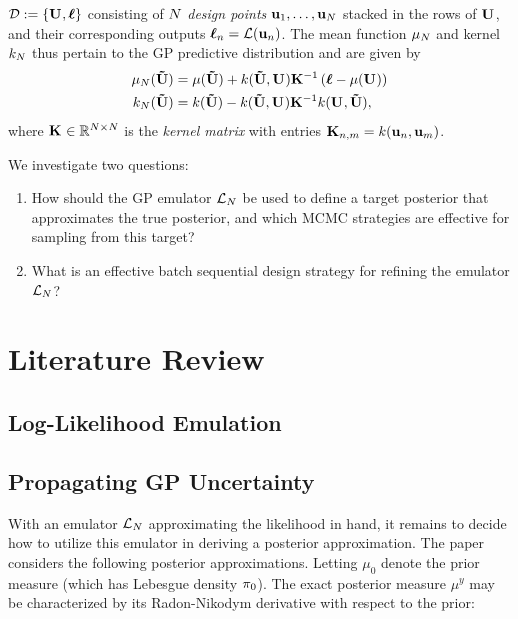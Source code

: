 \documentclass[12pt]{article}
\begin{document}
$\designData := \{\designMat[], \designOutLik\}$ consisting of $\Ndesign$ \textit{design points} 
$\bpar_1, \dots, \bpar_{\Ndesign}$ stacked in the rows of $\designMat[]$, and their corresponding outputs $\designOutLik_{\designIdx} = \llik(\bpar_{\designIdx})$. The 
mean function $\GPMeanPred[\Ndesign]$ and kernel $\GPKerPred[\Ndesign]$ thus pertain to the GP predictive distribution and are given by 
\begin{align}
\GPMeanPred[\Ndesign](\newInputMat) &= \GPMean(\newInputMat) + \GPKer(\newInputMat, \designMat[]) \KerMat[]^{-1} \left(\designOutLik - \GPMean(\designMat[]) \right) \label{kriging_eqns} \\
\GPKerPred[\Ndesign](\newInputMat) &= \GPKer(\newInputMat) - \GPKer(\newInputMat, \designMat[]) \KerMat[]^{-1} \GPKer(\designMat[], \newInputMat),
\end{align}
where $\KerMat[] \in \R^{\Ndesign \times \Ndesign}$ is the \textit{kernel matrix} with entries $\KerMat[n,m] = \GPKer(\bpar_n, \bpar_m)$. 

We investigate two questions: 
\begin{enumerate}
\item How should the GP emulator $\llik_{\Ndesign}$ be used to define a target posterior that approximates the true posterior, and which MCMC 
strategies are effective for sampling from this target?
\item What is an effective batch sequential design strategy for refining the emulator $\llik_{\Ndesign}$? 
\end{enumerate}

\section{Literature Review}

\subsection{Log-Likelihood Emulation}

\subsection{Propagating GP Uncertainty}
With an emulator $\llik_{\Ndesign}$ approximating the likelihood in hand, it remains to decide how to utilize this emulator in deriving a posterior approximation. 
The paper \cite{StuartTeck1} considers the following posterior approximations. Letting $\mu_0$ denote the prior measure (which has Lebesgue density 
$\priorDens$). The exact posterior measure $\mu^y$ may be characterized by its Radon-Nikodym derivative with respect to the prior:
\end{document}
